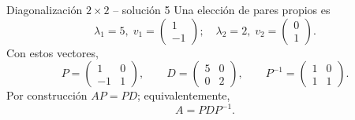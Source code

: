 \documentclass[aspectratio=169,10pt]{beamer}
\begin{document}
\begin{frame}{Diagonalización $2\times 2$ -- solución 5}
\scriptsize
Una elección de pares propios es
\[
\lambda_1=5,\;v_1=\begin{pmatrix}1\\-1\end{pmatrix};\quad \lambda_2=2,\;v_2=\begin{pmatrix}0\\1\end{pmatrix}.
\]
Con estos vectores,
\[
P=\begin{pmatrix}1 & 0\\-1 & 1\end{pmatrix},\qquad D=\begin{pmatrix}5 & 0\\0 & 2\end{pmatrix},\qquad P^{-1}=\begin{pmatrix}1 & 0\\1 & 1\end{pmatrix}.
\]
Por construcción $AP=PD$; equivalentemente,
\[
\boxed{A=PDP^{-1}}.
\]
\end{frame}
\end{document}
